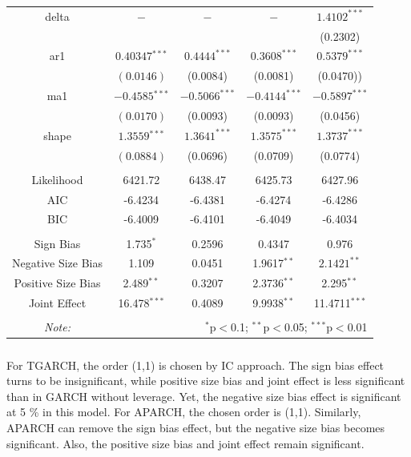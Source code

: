 \documentclass[a4paper]{article}
\begin{document}
\begin{table}[H]
\begin{tabular}{@{\extracolsep{5pt}} ccccc}
delta & $-$ & $-$ & $-$ & $1.4102^{***}$  \\ 
& & & & (0.2302)\\[1.8ex]

ar1 & $0.40347$$^{***}$ & $0.4444^{***}$ & $0.3608^{***}$ & $0.5379^{***}$ \\ 
& $(0.0146)$ & (0.0084) & (0.0081) & (0.0470))\\[1.8ex]

ma1 & $-0.4585$$^{***}$ & $-0.5066^{***}$ & $-0.4144^{***}$ & $-0.5897^{***}$  \\ 
& $(0.0170)$ & (0.0093) & (0.0093) & (0.0456)\\[1.8ex]

shape & $1.3559$$^{***}$ & $1.3641^{***}$ & $1.3575^{***}$ & $1.3737^{***}$  \\ 
& $(0.0884)$ & (0.0696) & (0.0709) & (0.0774)\\[1.8ex]

\hline \\[-1.8ex] 
Likelihood & 6421.72 & 6438.47 & 6425.73 & 6427.96\\ 
AIC& -6.4234 & -6.4381 & -6.4274 & -6.4286\\
BIC& -6.4009 & -6.4101 & -6.4049 & -6.4034\\

\hline \\[-1.8ex] 
Sign Bias & 1.735$^{*}$ & 0.2596 & 0.4347 & 0.976\\
Negative Size Bias & 1.109 & 0.0451 & 1.9617$^{**}$ & $2.1421^{**}$\\
Positive Size Bias & 2.489$^{**}$ & 0.3207 & 2.3736$^{**}$ & 2.295$^{**}$\\
Joint Effect & 16.478$^{***}$ & 0.4089 & 9.9938$^{**}$& 11.4711$^{***}$\\
\hline \\[-1.8ex] 

\textit{Note:}  & \multicolumn{4}{r}{$^{*}$p$<$0.1; $^{**}$p$<$0.05; $^{***}$p$<$0.01} \\ 
\end{tabular} 
\end{table} 

\subparagraph*{}
For TGARCH, the order (1,1) is chosen by IC approach. The sign bias effect turns to be insignificant, while positive size bias and joint effect is less significant than in GARCH without leverage. Yet, the negative size bias effect is significant at 5 \% in this model.
For APARCH, the chosen order is (1,1). Similarly, APARCH can remove the sign bias effect, but the negative size bias becomes significant. Also, the positive size bias and joint effect remain significant. 
\end{document}
